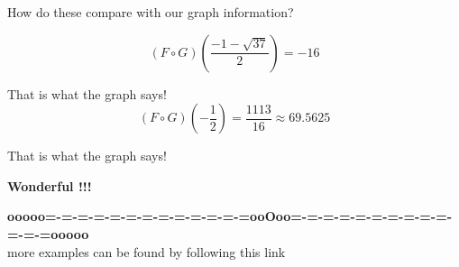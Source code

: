 \documentclass{ximera}
\begin{document}
How do these compare with our graph information? \




\[
(F \circ G)\left( \frac{-1 - \sqrt{37}}{2} \right) = -16
\]

That is what the graph says! \\






\[
(F \circ G)\left( -\frac{1}{2} \right) = \frac{1113}{16} \approx 69.5625
\]

That is what the graph says! \\


\begin{center}
\textbf{\textcolor{red!80!black}{Wonderful !!!}}
\end{center}





























\begin{center}
\textbf{\textcolor{green!50!black}{ooooo=-=-=-=-=-=-=-=-=-=-=-=-=ooOoo=-=-=-=-=-=-=-=-=-=-=-=-=ooooo}} \\

more examples can be found by following this link\\ 

\end{center}
\end{document}
